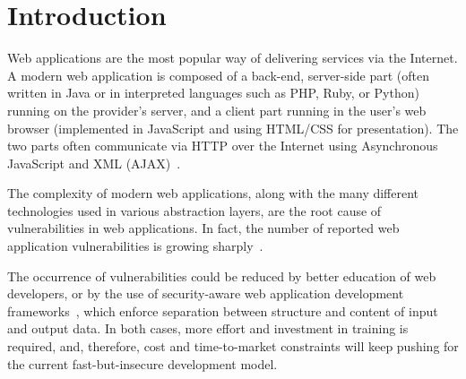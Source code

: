 


\section{Introduction}

Web applications are the most popular way of delivering services via the
Internet. A modern web application is composed of a back-end, server-side part
(often written in Java or in interpreted languages such as PHP, Ruby, or
Python) running on the provider's server, and a client part running in the
user's web browser (implemented in JavaScript and using HTML/CSS for
presentation). The two parts often communicate via HTTP over the Internet using
Asynchronous JavaScript and XML (AJAX)~\cite{garrett05:ajax}.

The complexity of modern web applications, along with the many different
technologies used in various abstraction layers, are the root cause of
vulnerabilities in web applications. In fact, the number of reported web
application vulnerabilities is growing sharply~\cite{steve07,
  fossi09:symantec}.

The occurrence of vulnerabilities could be reduced by better education of web
developers, or by the use of security-aware web application development
frameworks~\cite{robertson09, chong07}, which enforce separation between
structure and content of input and output data. In both cases, more effort and
investment in training is required, and, therefore, cost and time-to-market
constraints will keep pushing for the current fast-but-insecure development
model.

